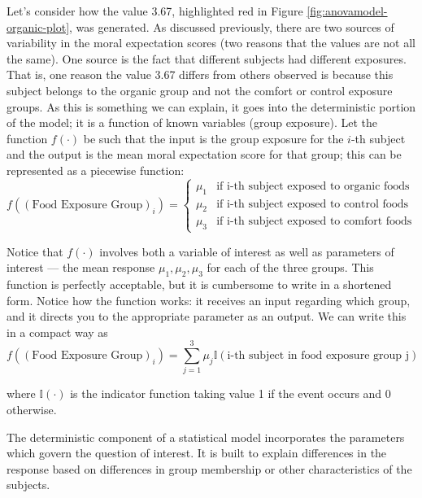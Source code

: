 \documentclass[]{book}
\theoremstyle{definition}
\theoremstyle{definition}
\theoremstyle{definition}
\theoremstyle{remark}
\let\BeginKnitrBlock\begin \let\EndKnitrBlock\end
\begin{document}
Let's consider how the value 3.67, highlighted red in Figure
\ref{fig:anovamodel-organic-plot}, was generated. As discussed
previously, there are two sources of variability in the moral
expectation scores (two reasons that the values are not all the same).
One source is the fact that different subjects had different exposures.
That is, one reason the value 3.67 differs from others observed is
because this subject belongs to the organic group and not the comfort or
control exposure groups. As this is something we can explain, it goes
into the deterministic portion of the model; it is a function of known
variables (group exposure). Let the function \(f(\cdot)\) be such that
the input is the group exposure for the \(i\)-th subject and the output
is the mean moral expectation score for that group; this can be
represented as a piecewise function: \[
f\left((\text{Food Exposure Group})_i\right) = \begin{cases}
  \mu_1 & \text{if i-th subject exposed to organic foods} \\
  \mu_2 & \text{if i-th subject exposed to control foods} \\
  \mu_3 & \text{if i-th subject exposed to comfort foods} \end{cases}
\]

Notice that \(f(\cdot)\) involves both a variable of interest as well as
parameters of interest --- the mean response \(\mu_1, \mu_2, \mu_3\) for
each of the three groups. This function is perfectly acceptable, but it
is cumbersome to write in a shortened form. Notice how the function
works: it receives an input regarding which group, and it directs you to
the appropriate parameter as an output. We can write this in a compact
way as \[
f\left((\text{Food Exposure Group})_i\right) = \sum_{j=1}^{3} \mu_j \mathbb{I}\left(\text{i-th subject in food exposure group j}\right)
\]

where \(\mathbb{I}(\cdot)\) is the indicator function taking value 1 if
the event occurs and 0 otherwise.

\BeginKnitrBlock{rmdkeyidea}
The deterministic component of a statistical model incorporates the
parameters which govern the question of interest. It is built to explain
differences in the response based on differences in group membership or
other characteristics of the subjects.
\EndKnitrBlock{rmdkeyidea}
\end{document}
